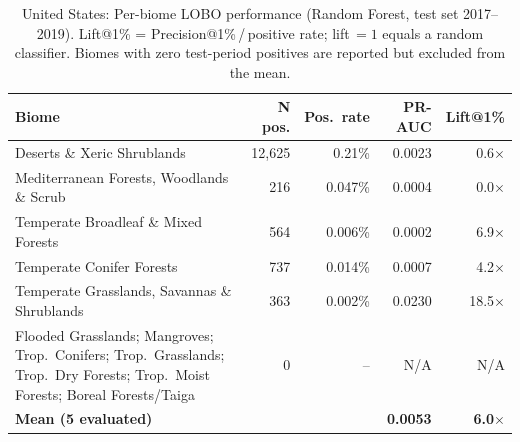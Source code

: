 \documentclass[12pt]{article}
\theoremstyle{break}
\begin{document}
\begin{appendices}
\begin{table}[!htbp]
\centering\small
\caption{United States: Per-biome LOBO performance (Random Forest, test set 2017--2019).
Lift@1\% = Precision@1\%\,/\,positive rate; lift\,$=1$ equals a random classifier.
Biomes with zero test-period positives are reported but excluded from the mean.}
\label{tab:lobo_usa}
\begin{tabular}{p{7cm}rrrr}
\toprule
\textbf{Biome} & \textbf{N pos.} & \textbf{Pos.\ rate} & \textbf{PR-AUC} & \textbf{Lift@1\%} \\
\midrule
Deserts \& Xeric Shrublands                      & 12{,}625 & 0.21\%  & 0.0023   & 0.6$\times$  \\
Mediterranean Forests, Woodlands \& Scrub         &    216   & 0.047\% & 0.0004   & 0.0$\times$  \\
Temperate Broadleaf \& Mixed Forests              &    564   & 0.006\% & 0.0002   & 6.9$\times$  \\
Temperate Conifer Forests                         &    737   & 0.014\% & 0.0007   & 4.2$\times$  \\
Temperate Grasslands, Savannas \& Shrublands      &    363   & 0.002\% & 0.0230   & 18.5$\times$ \\
Flooded Grasslands; Mangroves; Trop.\ Conifers; Trop.\ Grasslands; Trop.\ Dry Forests; Trop.\ Moist Forests; Boreal Forests/Taiga & 0 & -- & N/A & N/A \\
\midrule
\textbf{Mean (5 evaluated)} & & & \textbf{0.0053} & \textbf{6.0$\times$} \\
\bottomrule
\end{tabular}
\end{table}


\end{appendices}
\end{document}
